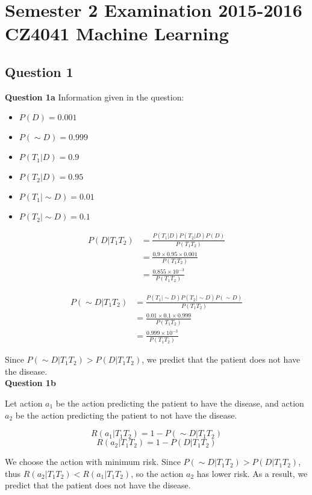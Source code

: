 \documentclass[11pt,a4paper]{report}
\begin{document}
\chapter{Semester 2 Examination 2015-2016\\CZ4041 Machine Learning}

\begin{multicols*}{2}

\section{Question 1}
\noindent \textbf{Question 1a}
\noindent Information given in the question:
\begin{itemize}
  \item $P(D) = 0.001$
  \item $P(\sim D) = 0.999$
  \item $P(T_1|D) = 0.9$
  \item $P(T_2|D) = 0.95$
  \item $P(T_1|\sim D) = 0.01$
  \item $P(T_2|\sim D) = 0.1$
\end{itemize}

\begin{equation*}
\begin{split}
P(D|T_1 T_2) &= \frac{P(T_1 | D) P(T_2 | D) P(D)}{P(T_1 T_2)}\\
&= \frac{0.9 \times 0.95 \times 0.001}{P(T_1 T_2)}\\
&= \frac{0.855 \times 10^{-3}}{P(T_1 T_2)}
\end{split}
\end{equation*}

\begin{equation*}
\begin{split}
P(\sim D|T_1 T_2) &= \frac{P(T_1 | \sim D) P(T_2 | \sim D) P(\sim D)}{P(T_1 T_2)}\\
&= \frac{0.01 \times 0.1 \times 0.999}{P(T_1 T_2)}\\
&= \frac{0.999 \times 10^{-3}}{P(T_1 T_2)}
\end{split}
\end{equation*}

\noindent Since $P(\sim D|T_1 T_2) > P(D|T_1 T_2)$, we predict that the patient does not have the disease.\\

\noindent \textbf{Question 1b}

\noindent Let action $a_1$ be the action predicting the patient to have the disease, and action $a_2$ be the action predicting the patient to not have the disease.

$$R(a_1|T_1 T_2) = 1 - P(\sim D | T_1 T_2)$$
$$R(a_2|T_1 T_2) = 1 - P(D | T_1 T_2)$$

\noindent We choose the action with minimum risk. Since $P(\sim D|T_1 T_2) > P(D|T_1 T_2)$, thus $R(a_2|T_1 T_2) < R(a_1|T_1 T_2)$, so the action $a_2$ has lower risk. As a result, we predict that the patient does not have the disease.

\end{multicols*} 
\end{document}
